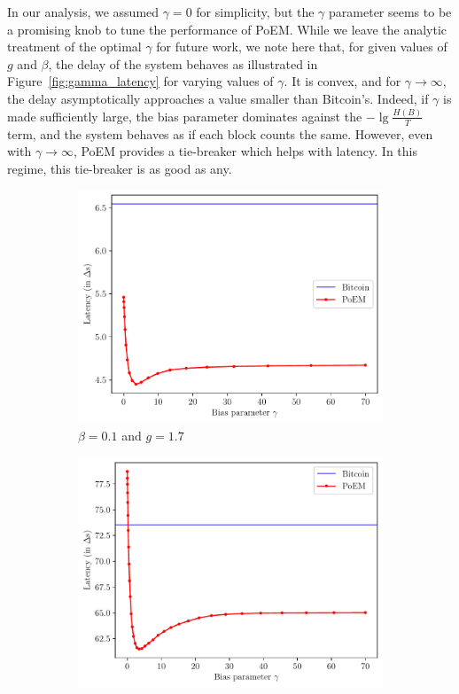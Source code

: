 In our analysis, we assumed $\gamma = 0$ for simplicity, but the $\gamma$ parameter
seems to be a promising knob to tune the performance of PoEM. While we leave
the
analytic treatment of the optimal $\gamma$ for future work, we note here that,
for given values of $g$ and $\beta$, the delay of the system behaves as illustrated
in Figure~\ref{fig:gamma_latency} for varying values of $\gamma$. It is convex, and for $\gamma \to \infty$,
the delay asymptotically approaches a value smaller than Bitcoin's. Indeed, if $\gamma$ is made sufficiently large, the bias
parameter dominates against the $-\lg\frac{H(B)}{T}$ term, and the system behaves
as if each block counts the same. However, even with $\gamma \to \infty$, PoEM provides a tie-breaker
which helps with latency. In this regime, this tie-breaker is as good as any.

\begin{figure}[h]
    \centering
    \begin{subfigure}{0.8\textwidth}
    \centering
    \includegraphics[width = \textwidth]{figures/gamma_latency_beta_0.1_g_1.7.pdf}
    \caption{$\beta = 0.1$ and $g = 1.7$}
    \label{fig:gamma_latency_0.1}
    \end{subfigure}
    \begin{subfigure}{0.8\textwidth}
    \centering
    \includegraphics[width = \textwidth]{figures/gamma_latency_beta_0.3_g_0.4.pdf}

\end{subfigure}
\end{figure}
